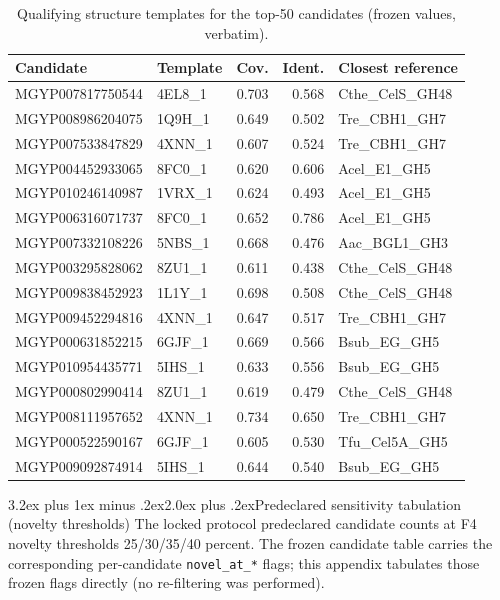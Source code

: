 \documentclass[11pt]{article}
\makeatletter
\renewcommand{\section}{\@startsection{section}{1}{\z@}%
  {3.2ex plus 1ex minus .2ex}{2.0ex plus .2ex}{\Large\bfseries\color{navy}}}
\makeatother
\begin{document}
\begin{table}[h]
\centering\footnotesize
{}
\begin{tabular}{|l|l|r|r|l|}
\hline
\rowcolor{lightnavy}\textbf{Candidate} & \textbf{Template} & \textbf{Cov.} & \textbf{Ident.} & \textbf{Closest reference} \\\hline
MGYP007817750544 & 4EL8\_1 & 0.703 & 0.568 & Cthe\_CelS\_GH48 \\\hline
MGYP008986204075 & 1Q9H\_1 & 0.649 & 0.502 & Tre\_CBH1\_GH7 \\\hline
MGYP007533847829 & 4XNN\_1 & 0.607 & 0.524 & Tre\_CBH1\_GH7 \\\hline
MGYP004452933065 & 8FC0\_1 & 0.620 & 0.606 & Acel\_E1\_GH5 \\\hline
MGYP010246140987 & 1VRX\_1 & 0.624 & 0.493 & Acel\_E1\_GH5 \\\hline
MGYP006316071737 & 8FC0\_1 & 0.652 & 0.786 & Acel\_E1\_GH5 \\\hline
MGYP007332108226 & 5NBS\_1 & 0.668 & 0.476 & Aac\_BGL1\_GH3 \\\hline
MGYP003295828062 & 8ZU1\_1 & 0.611 & 0.438 & Cthe\_CelS\_GH48 \\\hline
MGYP009838452923 & 1L1Y\_1 & 0.698 & 0.508 & Cthe\_CelS\_GH48 \\\hline
MGYP009452294816 & 4XNN\_1 & 0.647 & 0.517 & Tre\_CBH1\_GH7 \\\hline
MGYP000631852215 & 6GJF\_1 & 0.669 & 0.566 & Bsub\_EG\_GH5 \\\hline
MGYP010954435771 & 5IHS\_1 & 0.633 & 0.556 & Bsub\_EG\_GH5 \\\hline
MGYP000802990414 & 8ZU1\_1 & 0.619 & 0.479 & Cthe\_CelS\_GH48 \\\hline
MGYP008111957652 & 4XNN\_1 & 0.734 & 0.650 & Tre\_CBH1\_GH7 \\\hline
MGYP000522590167 & 6GJF\_1 & 0.605 & 0.530 & Tfu\_Cel5A\_GH5 \\\hline
MGYP009092874914 & 5IHS\_1 & 0.644 & 0.540 & Bsub\_EG\_GH5 \\\hline
\end{tabular}
\caption{Qualifying structure templates for the top-50 candidates (frozen values, verbatim).}
\end{table}

\section{Predeclared sensitivity tabulation (novelty thresholds)}
The locked protocol predeclared candidate counts at F4 novelty thresholds 25/30/35/40 percent. The frozen candidate table carries the corresponding per-candidate \texttt{novel\_at\_*} flags; this appendix tabulates those frozen flags directly (no re-filtering was performed).
\end{document}
